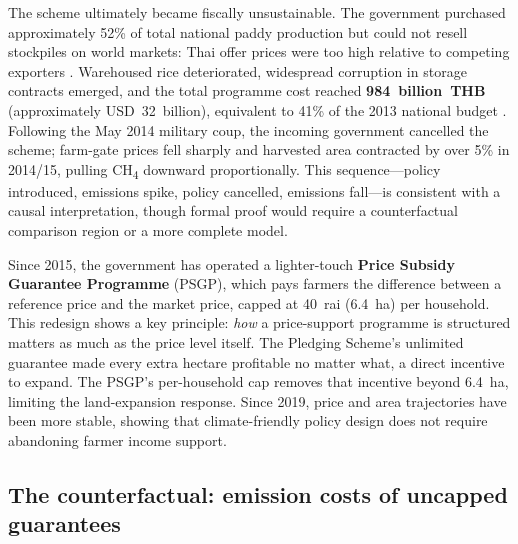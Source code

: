 \documentclass[fleqn,10pt]{olplainarticle}
\begin{document}
The scheme ultimately became fiscally unsustainable.
The government purchased approximately 52\% of total national paddy production
but could not resell stockpiles on world markets: Thai offer prices were too
high relative to competing exporters \citep{usda2017}.
Warehoused rice deteriorated, widespread corruption in storage contracts
emerged, and the total programme cost reached \textbf{984~billion~THB}
(approximately USD~32~billion), equivalent to 41\% of the 2013 national
budget \citep{poapongsakorn2014, usda2017}.
Following the May 2014 military coup, the incoming government cancelled the
scheme; farm-gate prices fell sharply and harvested area contracted by over
5\% in 2014/15, pulling CH\textsubscript{4} downward proportionally.
This sequence---policy introduced, emissions spike, policy cancelled, emissions
fall---is consistent with a causal interpretation, though formal proof would
require a counterfactual comparison region or a more complete model.

Since 2015, the government has operated a lighter-touch \textbf{Price Subsidy
Guarantee Programme} (PSGP), which pays farmers the difference between a
reference price and the market price, capped at 40~rai (6.4~ha) per household.
This redesign shows a key principle: \textit{how} a price-support programme
is structured matters as much as the price level itself.
The Pledging Scheme's unlimited guarantee made every extra hectare profitable
no matter what, a direct incentive to expand.
The PSGP's per-household cap removes that incentive beyond 6.4~ha, limiting
the land-expansion response.
Since 2019, price and area trajectories have been more stable, showing that
climate-friendly policy design does not require abandoning farmer income support.

\FloatBarrier
\subsection*{The counterfactual: emission costs of uncapped guarantees}
\end{document}
